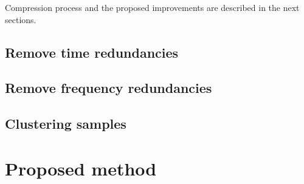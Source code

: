 \documentclass[conference,compsoc]{IEEEtran}
\begin{document}
Compression  process  and the proposed improvements are described in the next sections.

\subsection{Remove time redundancies}
\subsection{Remove frequency  redundancies}

\subsection{Clustering samples }



\section{Proposed method}




\end{document}
